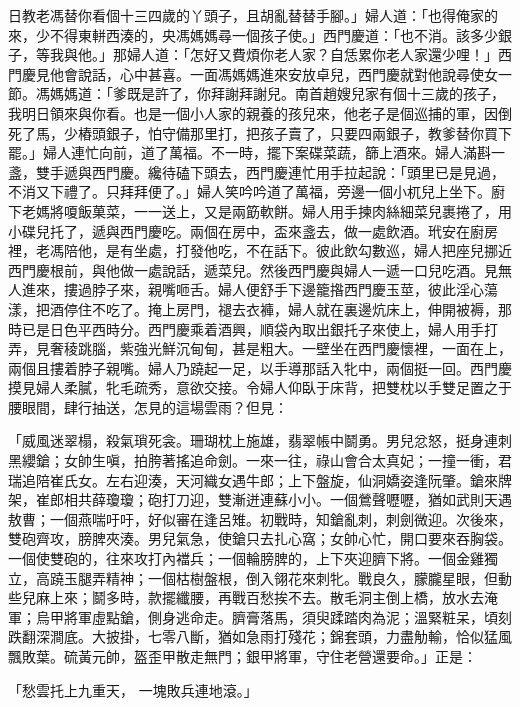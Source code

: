 \begin{showcontents}{}
日教老馮替你看個十三四歲的丫頭子，且胡亂替替手腳。」婦人道：「也得俺家的來，少不得東軿西湊的，央馮媽媽尋一個孩子使。」西門慶道：「也不消。該多少銀子，等我與他。」那婦人道：「怎好又費煩你老人家？自恁累你老人家還少哩！」西門慶見他會說話，心中甚喜。一面馮媽媽進來安放卓兒，西門慶就對他說尋使女一節。馮媽媽道：「爹既是許了，你拜謝拜謝兒。南首趙嫂兒家有個十三歲的孩子，我明日領來與你看。也是一個小人家的親養的孩兒來，他老子是個巡捕的軍，因倒死了馬，少樁頭銀子，怕守備那里打，把孩子賣了，只要四兩銀子，教爹替你買下罷。」婦人連忙向前，道了萬福。不一時，擺下案碟菜蔬，篩上酒來。婦人滿斟一盞，雙手遞與西門慶。纔待磕下頭去，西門慶連忙用手拉起說：「頭里已是見過，不消又下禮了。只拜拜便了。」婦人笑吟吟道了萬福，旁邊一個小杌兒上坐下。廚下老媽將嗄飯菓菜，一一送上，又是兩筯軟餅。婦人用手揀肉絲細菜兒裹捲了，用小碟兒托了，遞與西門慶吃。兩個在房中，盃來盞去，做一處飲酒。玳安在廚房裡，老馮陪他，是有坐處，打發他吃，不在話下。彼此飲勾數巡，婦人把座兒挪近西門慶根前，與他做一處說話，遞菜兒。然後西門慶與婦人一遞一口兒吃酒。見無人進來，摟過脖子來，親嘴咂舌。婦人便舒手下邊籠揝西門慶玉莖，彼此淫心蕩漾，把酒停住不吃了。掩上房門，褪去衣褲，婦人就在裏邊炕床上，伸開被褥，那時已是日色平西時分。西門慶乘着酒興，順袋內取出銀托子來使上，婦人用手打弄，見奢稜跳腦，紫強光鮮沉甸甸，甚是粗大。一壁坐在西門慶懷裡，一面在上，兩個且摟着脖子親嘴。婦人乃蹺起一足，以手導那話入牝中，兩個挺一回。西門慶摸見婦人柔膩，牝毛疏秀，意欲交接。令婦人仰臥于床背，把雙枕以手雙足置之于腰眼間，肆行抽送，怎見的這場雲雨？但見：

「威風迷翠榻，殺氣瑣死衾。珊瑚枕上施雄，翡翠帳中鬬勇。男兒忿怒，挺身連刺黑纓鎗；女帥生嗔，拍胯著搖追命劍。一來一往，祿山會合太真妃；一撞一衝，君瑞追陪崔氏女。左右迎湊，天河織女遇牛郎；上下盤旋，仙洞嬌姿逢阮肇。鎗來牌架，崔郎相共薛瓊瓊；砲打刀迎，雙漸迸連蘇小小。一個鶯聲嚦嚦，猶如武則天遇敖曹；一個燕喘吁吁，好似審在逢呂雉。初戰時，知鎗亂刺，刺劍微迎。次後來，雙砲齊攻，膀脾夾湊。男兒氣急，使鎗只去扎心窩；女帥心忙，開口要來吞胸袋。一個使雙砲的，往來攻打內襠兵；一個輪膀脾的，上下夾迎臍下將。一個金雞獨立，高蹺玉腿弄精神；一個枯樹盤根，倒入翎花來刺牝。戰良久，朦朧星眼，但動些兒麻上來；鬬多時，款擺纖腰，再戰百愁挨不去。散毛洞主倒上橋，放水去淹軍；烏甲將軍虛點鎗，側身逃命走。臍膏落馬，須臾蹂踏肉為泥；溫緊粧呆，頃刻跌翻深澗底。大披掛，七零八斷，猶如急雨打殘花；錦套頭，力盡觔輸，恰似猛風飄敗葉。硫黃元帥，盔歪甲散走無門；銀甲將軍，守住老營還要命。」正是：

「愁雲托上九重天，  一塊敗兵連地滾。」


\end{showcontents}
